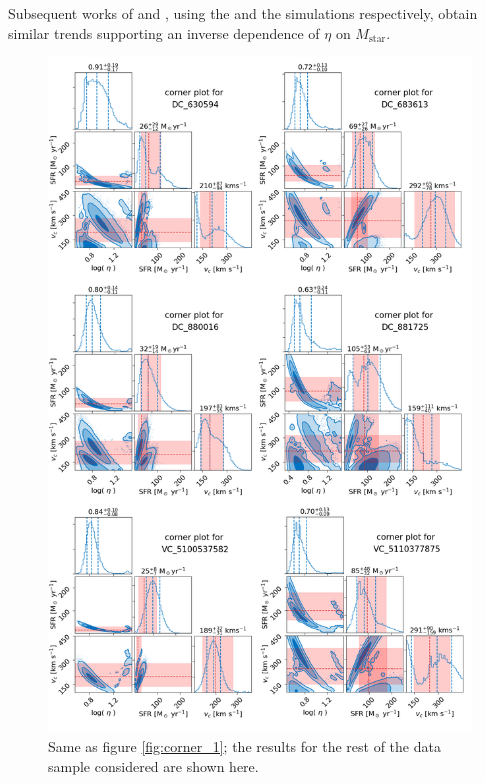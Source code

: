 Subsequent works of \citet{mitchell2021gas} and \citet{pandya2021characterizing}, using the  and the  simulations respectively, obtain similar trends supporting an inverse dependence of $\eta$ on $M_\mathrm{star}$.

\begin{figure}
    \centering
    \includegraphics[width=1.0\textwidth]{plots/corner_final_2.png}
    \caption{Same as figure \ref{fig:corner_1}; the results for the rest of the data sample considered are shown here. 
    \label{fig:corner_2}
    }
\end{figure}
